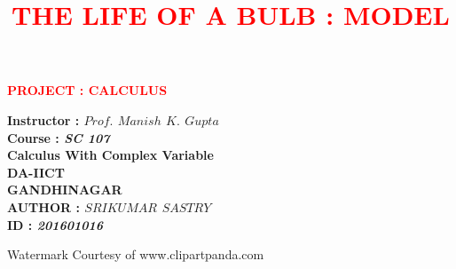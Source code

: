\documentclass[a4paper]{article}
\title{\huge{\textcolor{red}{\textbf{{THE LIFE OF A BULB : MODEL\hspace{5 mm}\textcopyright}}}}}
\date{\vspace{-5ex}}
\begin{document}
\begin{center}
\Huge{{\bf\textcolor{red}
{PROJECT : CALCULUS}
\vspace{2 cm}
}

\huge{\textbf{
Instructor : {$Prof.$ $Manish$ $K.$ $Gupta$}\\
Course : \textit{SC 107}\\
Calculus With Complex Variable\\
DA-IICT\\
GANDHINAGAR\\
\vspace{4 cm}
AUTHOR : \textit{$SRIKUMAR$ $SASTRY$}\\
ID : \textit{201601016}\\
}
}
}
\vspace*{\fill}
\large{Watermark Courtesy of www.clipartpanda.com}
\end{center}
\end{document}

